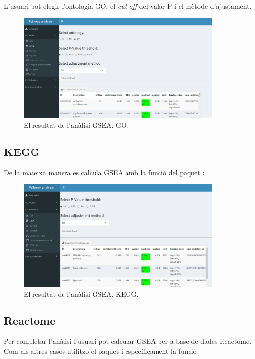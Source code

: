 L'usuari pot elegir l'ontologia GO, el \textit{cut-off} del valor P i el mètode d'ajustament.
\begin{figure}[H]
\centering
\includegraphics[width=0.9\textwidth]{App_F11_Items_GO_GSEA.png} 
\caption{El resultat de l'anàlisi GSEA. GO.}
\end{figure}


\subsection{KEGG}
De la mateixa manera es calcula GSEA amb la funció  del paquet :

\begin{figure}[H]
\centering
\includegraphics[width=0.9\textwidth]{App_F12_Items_KEGG_GSEA.png} 
\caption{El resultat de l'anàlisi GSEA. KEGG.}
\end{figure}

\subsection{Reactome}
Per completar l'anàlisi l'usuari pot calcular GSEA per a base de dades Reactome. Com als altres casos utilitzo el paquet  i específicament la funció 

